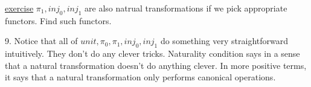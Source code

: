 \documentclass{report}[12pt]
\begin{document}
\begin{definition}
\underline{exercise} $\pi_1, inj_0, inj_1$ are also natrual transformations if we pick appropriate functors. Find such functors.

9. Notice that all of $unit, \pi_0, \pi_1, inj_0, inj_1$ do something very straightforward intuitively. They don't do any clever tricks. Naturality condition says in a sense that a natural transformation doesn't do anything clever. In more positive terms, it says that a natural transformation only performs canonical operations.
\end{definition}
\end{document}
